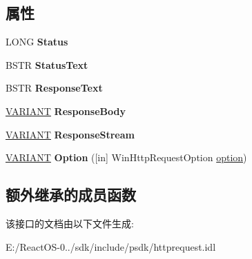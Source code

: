 \subsection*{属性}
\begin{DoxyCompactItemize}
\item 
\mbox{\label{interface_win_http_1_1_i_win_http_request_a70f5a8f90fab679544a4a22a1c84e852}} 
L\+O\+NG {\bfseries Status}
\item 
\mbox{\label{interface_win_http_1_1_i_win_http_request_aa17e6df81ead2ac15606fb3839774b7a}} 
B\+S\+TR {\bfseries Status\+Text}
\item 
\mbox{\label{interface_win_http_1_1_i_win_http_request_ac1dc5e12d795e3e5e70a902dc2211c40}} 
B\+S\+TR {\bfseries Response\+Text}
\item 
\mbox{\label{interface_win_http_1_1_i_win_http_request_a876e7897890a9762c06d743ba05bd218}} 
\hyperlink{structtag_v_a_r_i_a_n_t}{V\+A\+R\+I\+A\+NT} {\bfseries Response\+Body}
\item 
\mbox{\label{interface_win_http_1_1_i_win_http_request_a92f6a87a222b20377194544755d28da2}} 
\hyperlink{structtag_v_a_r_i_a_n_t}{V\+A\+R\+I\+A\+NT} {\bfseries Response\+Stream}
\item 
\mbox{\label{interface_win_http_1_1_i_win_http_request_a8f4946195c55454198ef6b098bc14be4}} 
\hyperlink{structtag_v_a_r_i_a_n_t}{V\+A\+R\+I\+A\+NT} {\bfseries Option} (\mbox{[}in\mbox{]} Win\+Http\+Request\+Option \hyperlink{structoption}{option})
\end{DoxyCompactItemize}
\subsection*{额外继承的成员函数}


该接口的文档由以下文件生成\+:\begin{DoxyCompactItemize}
\item 
E\+:/\+React\+O\+S-\/0../sdk/include/psdk/httprequest.\+idl\end{DoxyCompactItemize}
